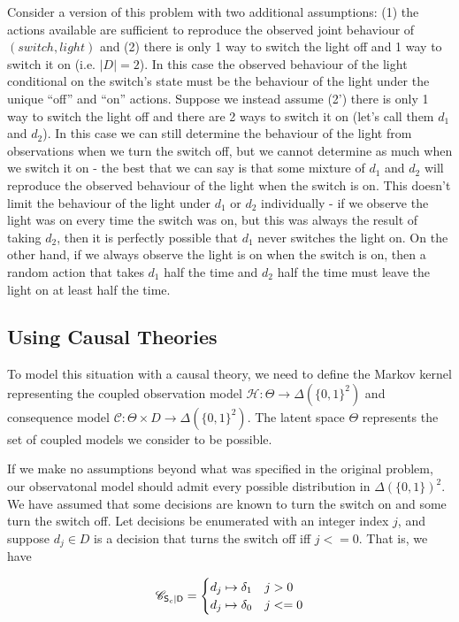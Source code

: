 Consider a version of this problem with two additional assumptions: (1) the actions available are sufficient to reproduce the observed joint behaviour of $(switch,light)$ and (2) there is only 1 way to switch the light off and 1 way to switch it on (i.e. $|D|=2$). In this case the observed behaviour of the light conditional on the switch's state must be the behaviour of the light under the unique ``off'' and ``on'' actions. Suppose we instead assume (2') there is only 1 way to switch the light off and there are 2 ways to switch it on (let's call them $d_1$ and $d_2$). In this case we can still determine the behaviour of the light from observations when we turn the switch off, but we cannot determine as much when we switch it on - the best that we can say is that some mixture of $d_1$ and $d_2$ will reproduce the observed behaviour of the light when the switch is on. This doesn't limit the behaviour of the light under $d_1$ or $d_2$ individually - if we observe the light was on every time the switch was on, but this was always the result of taking $d_2$, then it is perfectly possible that $d_1$ never switches the light on. On the other hand, if we always observe the light is on when the switch is on, then a random action that takes $d_1$ half the time and $d_2$ half the time must leave the light on at least half the time.

\subsection{Using Causal Theories}

To model this situation with a causal theory, we need to define the Markov kernel representing the coupled observation model $\mathscr{H}:\Theta\to \Delta(\{0,1\}^2)$ and consequence model $\mathscr{C}:\Theta\times D\to \Delta(\{0,1\}^2)$. The latent space $\Theta$ represents the set of coupled models we consider to be possible.

If we make no assumptions beyond what was specified in the original problem, our observatonal model should admit every possible distribution in $\Delta(\{0,1\})^2$. We have assumed that some decisions are known to turn the switch on and some turn the switch off. Let decisions be enumerated with an integer index $j$, and suppose $d_j\in D$ is a decision that turns the switch off iff $j<=0$. That is, we have

\begin{align}
\mathscr{C}_{\mathsf{S}_c|\mathsf{D}} = \begin{cases}
d_j \mapsto \delta_1 & j>0\\
d_j \mapsto \delta_0 & j<=0
\end{cases}
\end{align}

